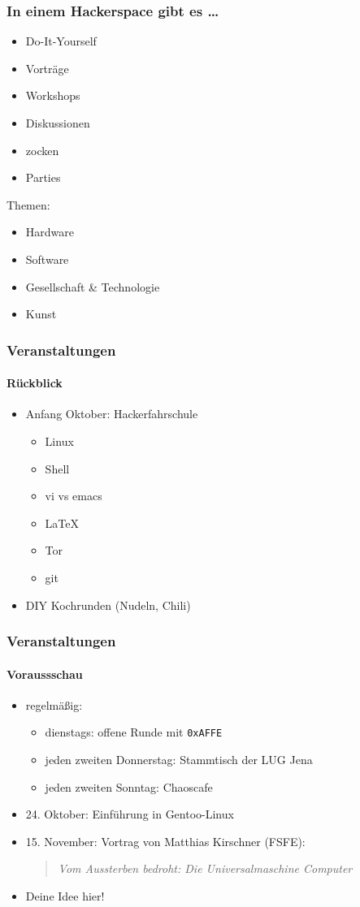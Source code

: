 \documentclass[english,compress,handout]{beamer}
\begin{document}
\begin{center}
\begin{frame}
	\frametitle{In einem Hackerspace gibt es \ldots}
	\begin{itemize}
		\item Do-It-Yourself
		\item Vorträge
		\item Workshops
		\item Diskussionen
		\item zocken
		\item Parties
	\end{itemize}
	\pause
	\vfill
    Themen:
	\vfill
	\begin{itemize}
		\item Hardware
		\item Software
		\item Gesellschaft \& Technologie
		\item Kunst
	\end{itemize}
\end{frame}

\begin{frame}
	\frametitle{Veranstaltungen}
	\framesubtitle{Rückblick}
	\begin{itemize}
		\item Anfang Oktober: Hackerfahrschule 
			\begin{itemize}
				\item Linux
				\item Shell
				\item vi vs emacs
				\item \LaTeX{}
				\item Tor
				\item git
			\end{itemize}
		\item DIY Kochrunden (Nudeln, Chili)
	\end{itemize}
\end{frame}

\begin{frame}
	\frametitle{Veranstaltungen}
	\framesubtitle{Voraussschau}
	\begin{itemize}
		\item regelmäßig:
			\begin{itemize}
				\item dienstags: offene Runde mit \texttt{0xAFFE}
				\item jeden zweiten Donnerstag: Stammtisch der LUG Jena
				\item jeden zweiten Sonntag: Chaoscafe
			\end{itemize}
		\item 24. Oktober: Einführung in Gentoo-Linux
		\item 15. November: Vortrag von Matthias Kirschner (FSFE):  \\
			\begin{quote}
				\textit{Vom Aussterben bedroht: Die Universalmaschine Computer}
			\end{quote}
		\item Deine Idee hier!
	\end{itemize}	
\end{frame}


\end{center}
\end{document}
